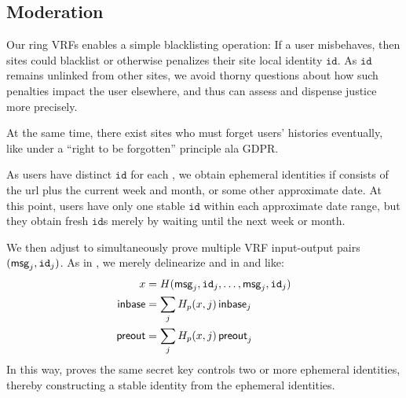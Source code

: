 {\begin{comment}
A priori, our JubJub representations $\sk_0 \genJ_0 + \sk_1 \genJ_1$
used in \S\ref{subsec:rvrf_faster} and \S\ref{subsec:rvrf_side_channel}
costs us exculpability from Definition \ref{def:rvrf_exculpability}.

There is however a natural {\em exculpable public key} flavor $(\pk,\sigma)$,
in which
$\sigma = \Sign(\sk, \CommitRing(\{ \pk \},\pk).\openring, \mathtt{ring\_name}, \mathtt{""})$.
The singleton ring $\{ \pk \}$ ensure that 
$\rVerify(\CommitRing(\{\pk\}), \mathtt{ring\_name}, \mathtt{""}, \sigma)$
uniquely determines the secret key, so exculpability holds
if joining the ring requires $(\pk,\sigma)$.

\eprint{}{\end{comment}}


\subsection{Moderation}
\label{subsec:moderation}


Our ring VRFs enables a simple blacklisting operation:
If a user misbehaves, then sites could blacklist or otherwise penalizes
their site local identity $\mathtt{id}$.
As $\mathtt{id}$ remains unlinked from other sites, we avoid thorny
questions about how such penalties impact the user elsewhere, and thus
can assess and dispense justice more precisely. 

At the same time, there exist sites who must forget users' histories
eventually, like under a ``right to be forgotten'' principle ala GDPR.

As users have distinct $\mathtt{id}$ for each \msg,
we obtain ephemeral identities if \msg consists of the url plus
the current week and month, or some other approximate date.
At this point, users have only one stable $\mathtt{id}$ within each
approximate date range, but they obtain fresh $\mathtt{id}$s merely
by waiting until the next week or month.

We then adjust \PedVRF to simultaneously prove multiple VRF input-output
pairs $(\mathsf{msg}_j,\mathtt{id}_j)$.  As in \cite{PrivacyPass}, we merely
delinearize \In and \PreOut in \rSign and \rVerify like:
\begin{align*}
	x &= H(\mathsf{msg}_j,\mathtt{id}_j,\ldots,\mathsf{msg}_j,\mathtt{id}_j) \\
	{\mathsf{inbase}} &= \sum_j H_p(x,j) \, {\mathsf{inbase}}_j \\
	{\mathsf{preout}} &= \sum_j H_p(x,j) \, {\mathsf{preout}}_j \\
\end{align*}
In this way, \PedVRF proves the same secret key controls two or more
ephemeral identities, thereby constructing a stable identity from the
ephemeral identities.

